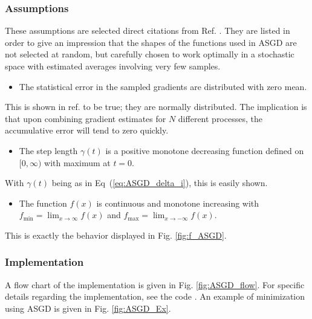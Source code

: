 \subsubsection{Assumptions}

These assumptions are selected direct citations from Ref. \cite{ASGD}. They are listed in order to give an impression that the shapes of the functions used in ASGD are not selected at random, but carefully chosen to work optimally in a stochastic space with estimated averages involving very few samples.

\begin{itemize}
 \item The statistical error in the sampled gradients are distributed with zero mean.
\end{itemize}

This is shown in ref. to be true; they are normally distributed. The implication is that upon combining gradient estimates for $N$ different processes, the accumulative error will tend to zero quickly.

\begin{itemize}
 \item The step length $\gamma(t)$ is a positive monotone decreasing function defined on $[0,\infty)$ with maximum at $t=0$.
\end{itemize}

With $\gamma(t)$ being as in Eq~(\ref{eq:ASGD_delta_i}), this is easily shown.

\begin{itemize}
 \item The function $f(x)$ is continuous and monotone increasing with $f_\mathrm{min} = \displaystyle\lim_{x\to\infty} f(x)$ and $f_\mathrm{max} =  \displaystyle\lim_{x\to-\infty} f(x)$.
\end{itemize}

This is exactly the behavior displayed in Fig. \ref{fig:f_ASGD}.

\subsubsection{Implementation}

A flow chart of the implementation is given in Fig. \ref{fig:ASGD_flow}. For specific details regarding the implementation, see the code \cite{libBorealisCode}. An example of minimization using ASGD is given in Fig. \ref{fig:ASGD_Ex}. 


